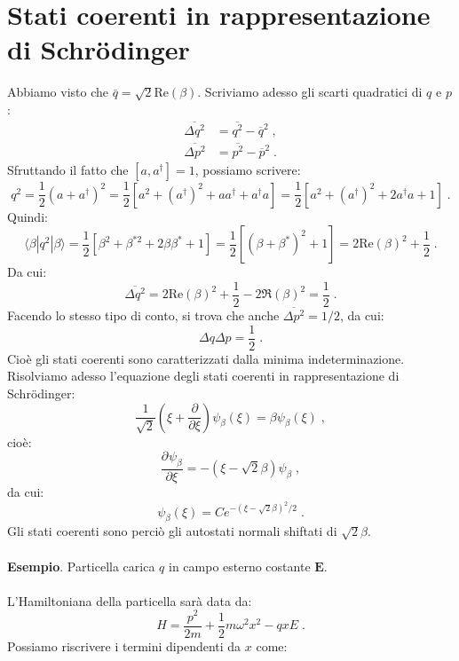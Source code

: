 \documentclass[10pt,a4paper]{report}
\theoremstyle{definition}
\newcommand{\pdev}[3][]{\frac{\partial^{#1} #2}{\partial #3^{#1}}}
\numberwithin{equation}{section}
\newcommand{\bra}{\langle}
\newcommand{\ket}{\rangle}
\newcommand{\Sch}{Schrödinger}
\newcommand{\adj}[1]{#1^{\dagger}}
\begin{document}
\section{Stati coerenti in rappresentazione di \Sch}
Abbiamo visto che $\bar{q}=\sqrt{2}\mathrm{Re}(\beta)$. Scriviamo adesso gli scarti quadratici di $q$ e $p$:
\begin{align*}
\overline{\Delta q^2} &=\overline{q^2}-\overline{q}^2\;, \\
\overline{\Delta p^2} &= \overline{p^2}-\overline{p}^2\;.
\end{align*}
Sfruttando il fatto che $[a,\adj{a}]=1$, possiamo scrivere:
$$
q^2=\frac{1}{2}(a+\adj{a})^2=\frac{1}{2}\left[a^2+(\adj{a})^2+a\adj{a}+\adj{a}a\right]=\frac{1}{2}\left[a^2+(\adj{a})^2+2\adj{a}a+1\right]\;.
$$
Quindi:
\begin{equation}
\bra\beta|q^2|\beta\ket=\frac{1}{2}\left[\beta^2+\beta^{*2}+2\beta\beta^*+1\right]=\frac{1}{2}\left[(\beta+\beta^*)^2+1\right]=2\mathrm{Re}(\beta)^2+\frac{1}{2}\;.
\end{equation}
Da cui:
\begin{equation}
\overline{\Delta q^2}=2\mathrm{Re}(\beta)^2+\frac{1}{2}-2\Re(\beta)^2=\frac{1}{2}\;.
\end{equation}
Facendo lo stesso tipo di conto, si trova che anche $\overline{\Delta p^2}=1/2$, da cui:
$$
\Delta q\Delta p=\frac{1}{2}\;.
$$
Cioè gli stati coerenti sono caratterizzati dalla minima indeterminazione. Risolviamo adesso l'equazione degli stati coerenti in rappresentazione di \Sch:
\begin{equation}
\frac{1}{\sqrt{2}}\left(\xi+\frac{\partial}{\partial\xi}\right)\psi_{\beta}(\xi)=\beta\psi_{\beta}(\xi)\;,
\end{equation}
cioè:
$$
\pdev{\psi_{\beta}}{\xi}=-(\xi-\sqrt{2}\beta)\psi_{\beta}\;,
$$
da cui:
\begin{equation}
\psi_{\beta}(\xi)=Ce^{-(\xi-\sqrt{2}\beta)^2/2}\;.
\end{equation}
Gli stati coerenti sono perciò gli autostati normali shiftati di $\sqrt{2}\beta$. \\
\\
\textbf{Esempio}. Particella carica $q$ in campo esterno costante $\mathbf{E}$. \\
\\
L'Hamiltoniana della particella sarà data da:
\begin{equation}
H=\frac{p^2}{2m}+\frac{1}{2}m\omega^2 x^2-qxE\;.
\end{equation}
Possiamo riscrivere i termini dipendenti da $x$ come:
\end{document}
